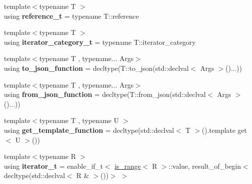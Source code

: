 \begin{DoxyCompactItemize}
\mbox{\label{namespacenlohmann_1_1detail_a082bdafd3b4c61d9d1e92b35b8f75ee3}} 
{\footnotesize template$<$typename T $>$ }\\using {\bfseries reference\+\_\+t} = typename T\+::reference
\item 
\mbox{\label{namespacenlohmann_1_1detail_ad22d2aa3aab018050ae519f6754366e1}} 
{\footnotesize template$<$typename T $>$ }\\using {\bfseries iterator\+\_\+category\+\_\+t} = typename T\+::iterator\+\_\+category
\item 
\mbox{\label{namespacenlohmann_1_1detail_af846b6cf2f926009ff3a7a61495ca383}} 
{\footnotesize template$<$typename T , typename... Args$>$ }\\using {\bfseries to\+\_\+json\+\_\+function} = decltype(T\+::to\+\_\+json(std\+::declval$<$ Args $>$()...))
\item 
\mbox{\label{namespacenlohmann_1_1detail_a1711ee5cef66a0523055c8d9f024f322}} 
{\footnotesize template$<$typename T , typename... Args$>$ }\\using {\bfseries from\+\_\+json\+\_\+function} = decltype(T\+::from\+\_\+json(std\+::declval$<$ Args $>$()...))
\item 
\mbox{\label{namespacenlohmann_1_1detail_ab4d22cdb6521ee3508db496dea66711e}} 
{\footnotesize template$<$typename T , typename U $>$ }\\using {\bfseries get\+\_\+template\+\_\+function} = decltype(std\+::declval$<$ T $>$().template get$<$ U $>$())
\item 
\mbox{\label{namespacenlohmann_1_1detail_a520ea901ba1560b9bc3e274b61497afe}} 
{\footnotesize template$<$typename R $>$ }\\using {\bfseries iterator\+\_\+t} = enable\+\_\+if\+\_\+t$<$ \hyperlink{structnlohmann_1_1detail_1_1is__range}{is\+\_\+range}$<$ R $>$\+::value, result\+\_\+of\+\_\+begin$<$ decltype(std\+::declval$<$ R \& $>$())$>$ $>$
\item 
\mbox{\label{namespacenlohmann_1_1detail_a1eb075b086024e7c18e3a56db93a6688}} 

\end{DoxyCompactItemize}
